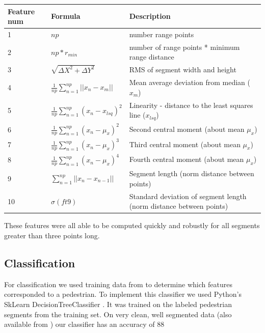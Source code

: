 \documentclass[10pt,twocolumn,letterpaper]{article}
\begin{document}
  \renewcommand{\arraystretch}{1.5}
  \begin{center}
    \begin{tabular}{ | p{1cm} | l | p{2.9cm} |}
      \hline
      Feature num & Formula & Description \\ \hline
      1 & $ np $ & number range points \\ \hline
      2 & $np*r_{min}$ & number of range points * minimum range distance \\ \hline
      3 & $\sqrt{ \Delta X^2 + \Delta Y^2} $ & RMS of segment width and height
      \\ \hline
      4 & $ \frac{1}{np}\sum_{n=1}^{np} || x_n - x_m|| $ & Mean average deviation
      from median ($x_m$) \\ \hline
      5 & $ \frac{1}{np}\sum_{n=1}^{np} (x_n - x_{lsq})^2 $ & Linearity - 
      distance to the least squares line ($ x_{lsq}$) \\ \hline
      6 & $ \frac{1}{np}\sum_{n=1}^{np} (x_n - \mu_x)^2 $ & Second central 
      moment (about mean $\mu_x$) \\ \hline
      7 & $ \frac{1}{np}\sum_{n=1}^{np} (x_n - \mu_x)^3 $ & Third central 
      moment (about mean $\mu_x$) \\ \hline
      8 & $ \frac{1}{np}\sum_{n=1}^{np} (x_n - \mu_x)^4 $ & Fourth central 
      moment (about mean $\mu_x$) \\ \hline
      9 & $ \sum_{n=1}^{np} ||x_n - x_{n-1}|| $ & Segment length (norm distance
      between points) \\ \hline
      10 & $ \sigma(ft9) $ & Standard deviation of
      segment length (norm distance between points) \\ \hline
    \end{tabular}
  \end{center}

  These features were all able to be computed quickly and robustly for all 
  segments greater than three points long.

  \subsection{Classification}
  For classification we used training data from \cite{dataset} to determine 
  which features corresponded to a pedestrian. To implement this classifier
  we used Python's SkLearn DecisionTreeClassifier \cite{sklearn}. 
  It was trained on the labeled pedestrian segments from the training set.
  On very clean, well segmented data (also available from \cite{journal})
  our classifier has an accuracy of 88%
\end{document}
